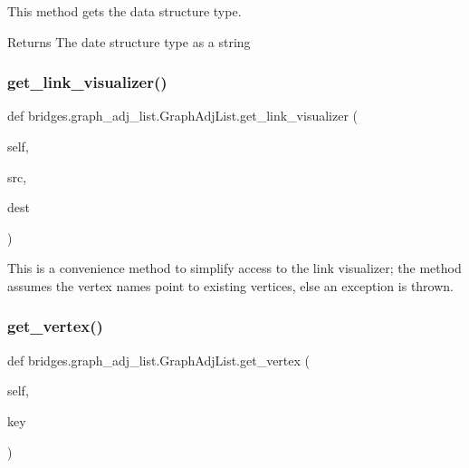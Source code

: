 This method gets the data structure type. 

\begin{DoxyReturn}{Returns}
The date structure type as a string 
\end{DoxyReturn}
\mbox{\label{classbridges_1_1graph__adj__list_1_1_graph_adj_list_abaa3015ae78e0f5ebc6fd2d2d2772927}} 
\subsubsection{\texorpdfstring{get\+\_\+link\+\_\+visualizer()}{get\_link\_visualizer()}}
{\footnotesize\ttfamily def bridges.\+graph\+\_\+adj\+\_\+list.\+Graph\+Adj\+List.\+get\+\_\+link\+\_\+visualizer (\begin{DoxyParamCaption}\item[{}]{self,  }\item[{}]{src,  }\item[{}]{dest }\end{DoxyParamCaption})}



This is a convenience method to simplify access to the link visualizer; the method assumes the vertex names point to existing vertices, else an exception is thrown. 

\mbox{\label{classbridges_1_1graph__adj__list_1_1_graph_adj_list_af484d881d91177e723faf8b8a5c427e2}} 
\subsubsection{\texorpdfstring{get\+\_\+vertex()}{get\_vertex()}}
{\footnotesize\ttfamily def bridges.\+graph\+\_\+adj\+\_\+list.\+Graph\+Adj\+List.\+get\+\_\+vertex (\begin{DoxyParamCaption}\item[{}]{self,  }\item[{}]{key }\end{DoxyParamCaption})}



